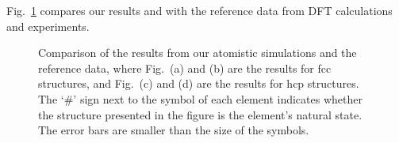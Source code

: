 \documentclass[%
 reprint,
 amsmath,amssymb,
 aps,
]{revtex4-1}
\begin{document}
Fig.~\ref{fig:compare} compares our results and with the reference data from DFT calculations and experiments.
\noindent\begin{figure}
\centering
\noindent\ignorespaces
{}
\newline
{}
\newline
{}
\newline
{}
\caption{\label{fig:compare}
 Comparison of the results from our atomistic simulations and the reference data, where Fig.~(a) and (b) are the results for fcc structures, and Fig.~(c) and (d) are the results for hcp structures.
 The `\#' sign next to the symbol of each element indicates whether the structure presented in the figure is the element's natural state.
 The error bars are smaller than the size of the symbols.
}
\end{figure}
\end{document}
